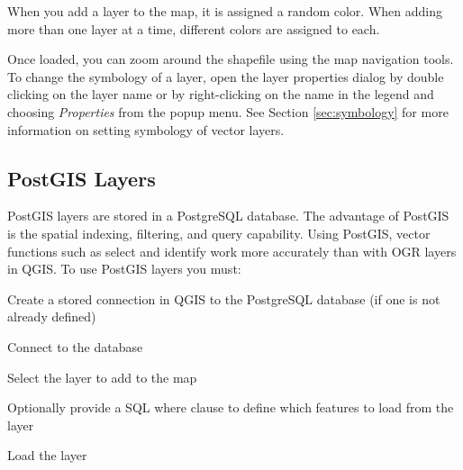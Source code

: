 \documentclass[10pt,english]{article}
\newcommand\qgistip[1]{\raggedright\small{#1}}
\begin{document}
\begin{onehalfspace}
\begin{figure}[h]
\end{figure}
\begin{Tip}\caption{\textsc{Layer Colors}}
\qgistip{When you add a layer to the map, it is assigned a random color. When adding more than one layer at a time, different colors are assigned to each. }
\end{Tip}

Once loaded, you can zoom around the shapefile using the map navigation tools. To change the symbology of a layer, open the layer properties dialog by double clicking on the layer name or by right-clicking on the name in the legend and choosing \textsl{Properties} from the popup menu. See Section \ref{sec:symbology} for more information on setting symbology of vector layers.
\subsection{PostGIS Layers}
PostGIS layers are stored in a PostgreSQL database. The advantage of PostGIS is the spatial indexing, filtering, and query capability. Using PostGIS, vector functions such as select and identify work more accurately than with OGR layers in QGIS.
To use PostGIS layers you must:
\begin{compactenum}
\item Create a stored connection in QGIS to the PostgreSQL database (if one is not already defined)
\item Connect to the database
\item Select the layer to add to the map
\item Optionally provide a SQL where clause to define which features to load from the layer
\item Load the layer
\end{compactenum}

\end{onehalfspace}
\end{document}

